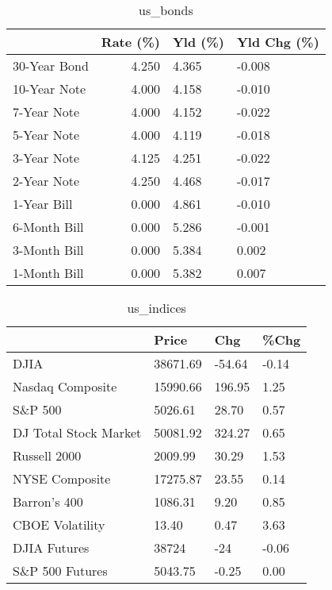 \documentclass{article}%
\begin{document}
\begin{table}[htbp]%
\caption{us\_bonds}%
\centering%
\begin{adjustbox}{width=1\textwidth}%
\begin{tabular}{lrll}
\toprule
             &  Rate (\%) & Yld (\%) & Yld Chg (\%) \\
\midrule
30-Year Bond &     4.250 &   4.365 &      -0.008 \\
10-Year Note &     4.000 &   4.158 &      -0.010 \\
 7-Year Note &     4.000 &   4.152 &      -0.022 \\
 5-Year Note &     4.000 &   4.119 &      -0.018 \\
 3-Year Note &     4.125 &   4.251 &      -0.022 \\
 2-Year Note &     4.250 &   4.468 &      -0.017 \\
 1-Year Bill &     0.000 &   4.861 &      -0.010 \\
6-Month Bill &     0.000 &   5.286 &      -0.001 \\
3-Month Bill &     0.000 &   5.384 &       0.002 \\
1-Month Bill &     0.000 &   5.382 &       0.007 \\
\bottomrule
\end{tabular}
%
\end{adjustbox}%
\end{table}

%


\begin{table}[htbp]%
\caption{us\_indices}%
\centering%
\begin{adjustbox}{width=1\textwidth}%
\begin{tabular}{llll}
\toprule
                      &    Price &    Chg &  \%Chg \\
\midrule
                 DJIA & 38671.69 & -54.64 & -0.14 \\
     Nasdaq Composite & 15990.66 & 196.95 &  1.25 \\
              S\&P 500 &  5026.61 &  28.70 &  0.57 \\
DJ Total Stock Market & 50081.92 & 324.27 &  0.65 \\
         Russell 2000 &  2009.99 &  30.29 &  1.53 \\
       NYSE Composite & 17275.87 &  23.55 &  0.14 \\
         Barron's 400 &  1086.31 &   9.20 &  0.85 \\
      CBOE Volatility &    13.40 &   0.47 &  3.63 \\
         DJIA Futures &    38724 &    -24 & -0.06 \\
      S\&P 500 Futures &  5043.75 &  -0.25 &  0.00 \\
\bottomrule
\end{tabular}
%
\end{adjustbox}%
\end{table}
\end{document}
